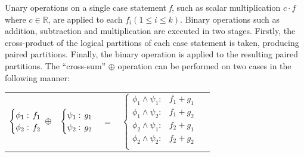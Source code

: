 Unary operations on a single case statement \emph{f}, such as scalar multiplication {\footnotesize$c \cdot f$} where {\footnotesize$ c \in \mathbb{R} $}, are applied to  each {\footnotesize$f_i \left(1 \leq i \leq k\right)$}. Binary operations such as addition, subtraction and multiplication are executed in two stages. Firstly, the cross-product of the logical partitions of each case statement is taken, producing paired partitions. Finally, the binary operation is applied to the resulting paired partitions. The ``cross-sum'' {\footnotesize$\oplus$} operation can be performed on two cases in the following manner:
{\footnotesize 
    \begin{center}
        \begin{tabular}{r c c c l}
            $\begin{cases}
            \phi_1: \hspace{-1mm} & \hspace{-1mm} f_1  \\ 
            \phi_2: \hspace{-1mm} & \hspace{-1mm} f_2  \\ 
            \end{cases}$
            $\oplus$
            &
            \hspace{-4mm}
            $\begin{cases}
            \psi_1: \hspace{-1mm} & \hspace{-1mm} g_1  \\ 
            \psi_2: \hspace{-1mm} & \hspace{-1mm} g_2  \\ 
            \end{cases}$
            &
            \hspace{-4mm} 
            $ = $
            &
            \hspace{-4mm}
            $\begin{cases}
            \phi_1 \wedge \psi_1: & f_1 + g_1 \\
            \phi_1 \wedge \psi_2: & f_1 + g_2 \\
            \phi_2 \wedge \psi_1: & f_2 + g_1 \\
            \phi_2 \wedge \psi_2: & f_2 + g_2  \\
            \end{cases}$
        \end{tabular}
    \end{center}
}%

